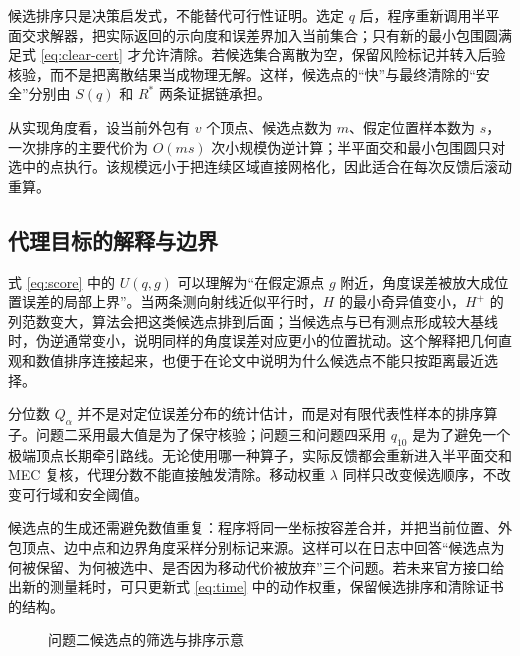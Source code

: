 候选排序只是决策启发式，不能替代可行性证明。选定 $q$ 后，程序重新调用半平面交求解器，把实际返回的示向度和误差界加入当前集合；只有新的最小包围圆满足式 \eqref{eq:clear-cert} 才允许清除。若候选集合离散为空，保留风险标记并转入后验核验，而不是把离散结果当成物理无解。这样，候选点的“快”与最终清除的“安全”分别由 $S(q)$ 和 $R^*$ 两条证据链承担。

从实现角度看，设当前外包有 $v$ 个顶点、候选点数为 $m$、假定位置样本数为 $s$，一次排序的主要代价为 $O(ms)$ 次小规模伪逆计算；半平面交和最小包围圆只对选中的点执行。该规模远小于把连续区域直接网格化，因此适合在每次反馈后滚动重算。

\subsection{代理目标的解释与边界}
式 \eqref{eq:score} 中的 $U(q,g)$ 可以理解为“在假定源点 $g$ 附近，角度误差被放大成位置误差的局部上界”。当两条测向射线近似平行时，$H$ 的最小奇异值变小，$H^+$ 的列范数变大，算法会把这类候选点排到后面；当候选点与已有测点形成较大基线时，伪逆通常变小，说明同样的角度误差对应更小的位置扰动。这个解释把几何直观和数值排序连接起来，也便于在论文中说明为什么候选点不能只按距离最近选择。

分位数 $Q_{\alpha}$ 并不是对定位误差分布的统计估计，而是对有限代表性样本的排序算子。问题二采用最大值是为了保守核验；问题三和问题四采用 $q_{10}$ 是为了避免一个极端顶点长期牵引路线。无论使用哪一种算子，实际反馈都会重新进入半平面交和 MEC 复核，代理分数不能直接触发清除。移动权重 $\lambda$ 同样只改变候选顺序，不改变可行域和安全阈值。

候选点的生成还需避免数值重复：程序将同一坐标按容差合并，并把当前位置、外包顶点、边中点和边界角度采样分别标记来源。这样可以在日志中回答“候选点为何被保留、为何被选中、是否因为移动代价被放弃”三个问题。若未来官方接口给出新的测量耗时，可只更新式 \eqref{eq:time} 中的动作权重，保留候选排序和清除证书的结构。

\begin{figure}[H]\centering
{}
\caption{问题二候选点的筛选与排序示意}\label{fig:q2-candidate}
\end{figure}

